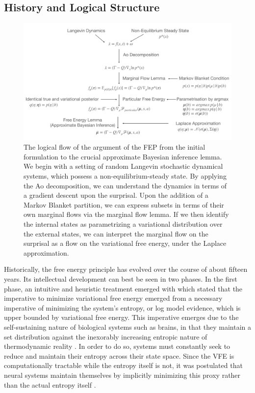 \subsection{History and Logical Structure}
\begin{figure}
    \centering
    \includegraphics[scale=0.2]{chapter_2_figures/FEP_logic_flow.pdf}
    \caption{The logical flow of the argument of the FEP from the initial formulation to the crucial approximate Bayesian inference lemma. We begin with a setting of random Langevin stochastic dynamical systems, which possess a non-equilibrium-steady state. By applying the Ao decomposition, we can understand the dynamics in terms of a gradient descent upon the surprisal. Upon the addition of a Markov Blanket partition, we can express subsets in terms of their own marginal flows via the marginal flow lemma. If we then identify the internal states as parametrizing a variational distribution over the external states, we can interpret the marginal flow on the surprisal as a flow on the variational free energy, under the Laplace approximation.}
\end{figure}
Historically, the free energy principle has evolved over the course of about fifteen years. Its intellectual development can best be seen in two phases. In the first phase, an intuitive and heuristic treatment emerged with \citet{friston2006free} which stated that the imperative to minimize variational free energy emerged from a necessary imperative of minimizing the system's entropy, or log model evidence, which is upper bounded by variational free energy. This imperative emerges due to the self-sustaining nature of biological systems such as brains, in that they maintain a set distribution against the inexorably increasing entropic nature of thermodynamic reality \citep{friston2009free}. In order to do so, systems must constantly seek to reduce and maintain their entropy across their state space. Since the VFE is computationally tractable while the entropy itself is not, it was postulated that neural systems maintain themselves by implicitly minimizing this proxy rather than the actual entropy itself \citep{friston2010free}.

